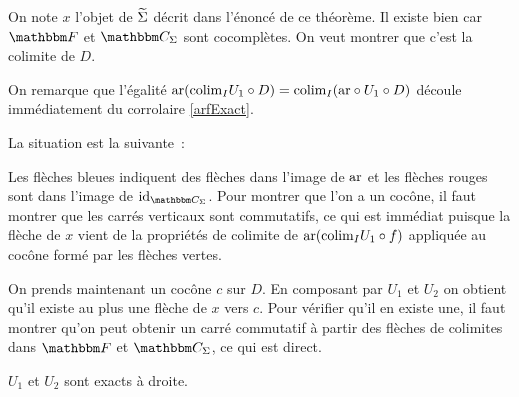 \begin{pv}
    On note $x$ l'objet de $\widetilde{\Sigma}$ décrit dans l'énoncé de ce théorème. Il existe
    bien car $\cf$ et $\C_\Sigma$ sont cocomplètes. On veut
    montrer que c'est la colimite de $D$.

    On remarque que l'égalité $\text{ar}(\text{colim}_I U_1\circ D) = \text{colim}_I (\text{ar}\circ U_1\circ D)$
    découle immédiatement du corrolaire \ref{arfExact}.

    La situation est la suivante~:

    \begin{center}\end{center}

    Les flèches bleues indiquent des flèches dans l'image de $\text{ar}$ et les flèches
    rouges sont dans l'image de $\id_{\C_\Sigma}$. Pour montrer que l'on a un cocône,
    il faut montrer que les carrés verticaux sont commutatifs, ce qui est immédiat
    puisque la flèche de $x$ vient de la propriétés de colimite de
    $\text{ar}(\text{colim}_I U_1\circ f)$ appliquée au cocône formé par les flèches vertes.

    On prends maintenant un cocône $c$ sur $D$. En composant par $U_1$ et $U_2$ on obtient
    qu'il existe au plus une flèche de $x$ vers $c$. Pour vérifier qu'il en existe une,
    il faut montrer qu'on peut obtenir un carré commutatif à partir des flèches de
    colimites dans $\cf$ et $\C_\Sigma$, ce qui est direct.
\end{pv}

\begin{cor}
    $U_1$ et $U_2$ sont exacts à droite.
\end{cor}


